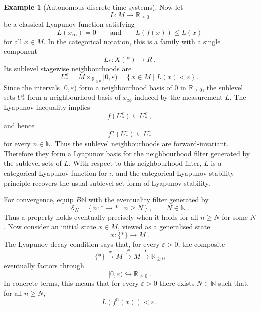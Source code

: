 \documentclass[a4paper,reqno,oneside]{amsart}
\theoremstyle{definition}
\newtheorem{example}[theorem]{Example}
\theoremstyle{remark}
\numberwithin{equation}{section}
\begin{document}
\begin{example}[Autonomous discrete-time systems]
Now let
\begin{equation}
    L\colon M\to\mathbb R_{\geq 0}
\end{equation}
be a classical Lyapunov function satisfying
\begin{equation}
    L(x_\infty)=0  \qquad \text{and} \qquad  L(f(x))\leq L(x)
\end{equation}
for all $x\in M$. In the categorical notation, this is a family with a single
component
\begin{equation}
    L_*\colon X(*)\to R \ .
\end{equation}
Its sublevel stagewise neighbourhoods are
\begin{equation}
    U^\varepsilon_*
    =
    M\times_{\mathbb R_{\geq 0}}[0,\varepsilon)
    =
    \{\,x\in M\mid L(x)<\varepsilon\,\} \ .
\end{equation}
Since the intervals $[0,\varepsilon)$ form a neighbourhood basis of $0$ in
$\mathbb R_{\geq 0}$, the sublevel sets $U^\varepsilon_*$ form a neighbourhood basis of $x_\infty$ induced by the measurement $L$. The Lyapunov inequality implies
\begin{equation}
    f(U^\varepsilon_*)\subseteq U^\varepsilon_* \ ,
\end{equation}
and hence
\begin{equation}
    f^n(U^\varepsilon_*)\subseteq U^\varepsilon_*
\end{equation}
for every $n\in\mathbb N$. Thus the sublevel neighbourhoods are
forward-invariant. Therefore they form a Lyapunov basis for the neighbourhood
filter generated by the sublevel sets of $L$. With respect to this
neighbourhood filter, $L$ is a categorical Lyapunov function for $\iota$, and
the categorical Lyapunov stability principle recovers the usual sublevel-set
form of Lyapunov stability.

For convergence, equip $B\mathbb N$ with the eventuality filter generated by
\begin{equation}
    \mathcal E_N
    =
    \{\,n\colon *\to *\mid n\geq N\,\} \ ,
    \qquad N\in\mathbb N \ .
\end{equation}
Thus a property holds eventually precisely when it holds for all $n\geq N$ for some $N$. Now consider an initial state $x \in M$, viewed as a generalised state
\begin{equation}
    x\colon \{*\}\to M \ .
\end{equation}
The Lyapunov decay condition says that, for every $\varepsilon>0$, the
composite
\begin{equation}
    \{*\}\xrightarrow{x}M\xrightarrow{f^n}M\xrightarrow{L}
    \mathbb R_{\geq 0}
\end{equation}
eventually factors through
\begin{equation}
    [0,\varepsilon)\hookrightarrow \mathbb R_{\geq 0} \ .
\end{equation}
In concrete terms, this means that for every $\varepsilon>0$ there exists
$N\in\mathbb N$ such that, for all $n\geq N$,
\begin{equation}
    L(f^n(x))<\varepsilon \ .
\end{equation}



\end{example}
\end{document}
